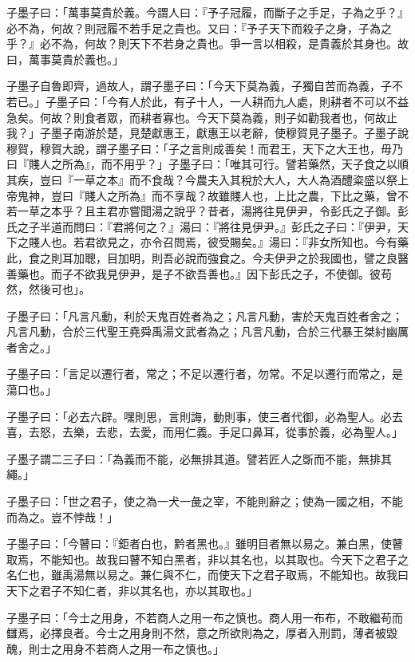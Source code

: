 
\begin{pinyinscope}
子墨子曰：「萬事莫貴於義。今謂人曰：『予子冠履，而斷子之手足，子為之乎？』必不為，何故？則冠履不若手足之貴也。又曰：『予子天下而殺子之身，子為之乎？』必不為，何故？則天下不若身之貴也。爭一言以相殺，是貴義於其身也。故曰，萬事莫貴於義也。」

子墨子自魯即齊，過故人，謂子墨子曰：「今天下莫為義，子獨自苦而為義，子不若已。」子墨子曰：「今有人於此，有子十人，一人耕而九人處，則耕者不可以不益急矣。何故？則食者眾，而耕者寡也。今天下莫為義，則子如勸我者也，何故止我？」子墨子南游於楚，見楚獻惠王，獻惠王以老辭，使穆賀見子墨子。子墨子說穆賀，穆賀大說，謂子墨子曰：「子之言則成善矣！而君王，天下之大王也，毋乃曰『賤人之所為』，而不用乎？」子墨子曰：「唯其可行。譬若藥然，天子食之以順其疾，豈曰『一草之本』而不食哉？今農夫入其稅於大人，大人為酒醴粢盛以祭上帝鬼神，豈曰『賤人之所為』而不享哉？故雖賤人也，上比之農，下比之藥，曾不若一草之本乎？且主君亦嘗聞湯之說乎？昔者，湯將往見伊尹，令彭氏之子御。彭氏之子半道而問曰：『君將何之？』湯曰：『將往見伊尹。』彭氏之子曰：『伊尹，天下之賤人也。若君欲見之，亦令召問焉，彼受賜矣。』湯曰：『非女所知也。今有藥此，食之則耳加聰，目加明，則吾必說而強食之。今夫伊尹之於我國也，譬之良醫善藥也。而子不欲我見伊尹，是子不欲吾善也。』因下彭氏之子，不使御。彼苟然，然後可也」。

子墨子曰：「凡言凡動，利於天鬼百姓者為之；凡言凡動，害於天鬼百姓者舍之；凡言凡動，合於三代聖王堯舜禹湯文武者為之；凡言凡動，合於三代暴王桀紂幽厲者舍之。」

子墨子曰：「言足以遷行者，常之；不足以遷行者，勿常。不足以遷行而常之，是蕩口也。」

子墨子曰：「必去六辟。嘿則思，言則誨，動則事，使三者代御，必為聖人。必去喜，去怒，去樂，去悲，去愛，而用仁義。手足口鼻耳，從事於義，必為聖人。」

子墨子謂二三子曰：「為義而不能，必無排其道。譬若匠人之斲而不能，無排其繩。」

子墨子曰：「世之君子，使之為一犬一彘之宰，不能則辭之；使為一國之相，不能而為之。豈不悖哉！」

子墨子曰：「今瞽曰：『鉅者白也，黔者黑也。』雖明目者無以易之。兼白黑，使瞽取焉，不能知也。故我曰瞽不知白黑者，非以其名也，以其取也。今天下之君子之名仁也，雖禹湯無以易之。兼仁與不仁，而使天下之君子取焉，不能知也。故我曰天下之君子不知仁者，非以其名也，亦以其取也。」

子墨子曰：「今士之用身，不若商人之用一布之慎也。商人用一布布，不敢繼苟而讎焉，必擇良者。今士之用身則不然，意之所欲則為之，厚者入刑罰，薄者被毀醜，則士之用身不若商人之用一布之慎也。」


\end{pinyinscope}
